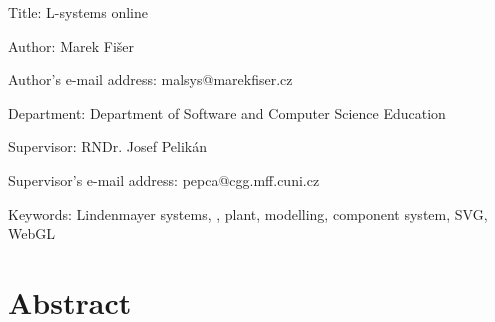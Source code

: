 {
\setlength\parindent{0mm}
\setlength\parskip{5mm}

Title: L-systems online

Author: Marek Fišer

Author's e-mail address: malsys@marekfiser.cz

Department: Department of Software and Computer Science Education

Supervisor: RNDr. Josef Pelikán

Supervisor's e-mail address: pepca@cgg.mff.cuni.cz

Keywords: Lindenmayer systems, \lsystems, plant, modelling, component system, SVG, WebGL

\section*{Abstract}
}



\begin{comment}
\vbox to 0.5\vsize{
\setlength\parindent{0mm}
\setlength\parskip{5mm}


Title:
L-systems online

Author:
Marek Fišer

Department:
Department of Software and Computer Science Education

Supervisor:
RNDr. Josef Pelikán, pracoviště


Abstract:  %

Keywords:  %
L-system, library, web

\vss}\nobreak\vbox to 0.49\vsize{
\setlength\parindent{0mm}
\setlength\parskip{5mm}


Název práce:
L-systémy online

Autor:
Marek Fišer

Katedra:
Kabinet software a výuky informatiky

Vedoucí bakalářské práce:
RNDr. Josef Pelikán, pracoviště


Abstrakt:  %


Klíčová slova:  %


\vss}
\end{comment}





































